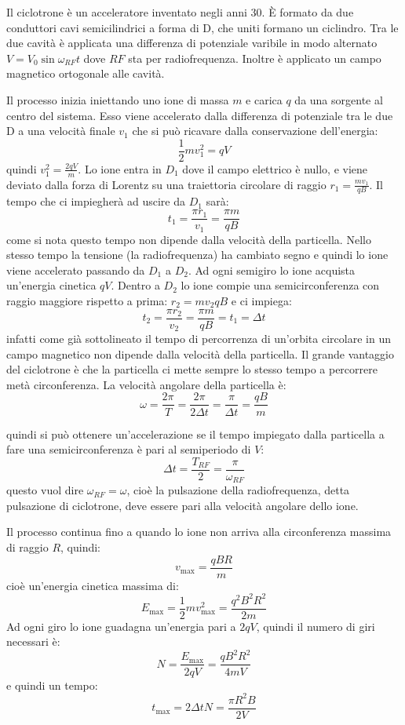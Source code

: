 \begin{Es}[Ciclotrone]
 Il ciclotrone  è un acceleratore inventato negli anni 30. È formato da due conduttori cavi semicilindrici a forma di D, che uniti formano un ciclindro. Tra le due cavità è applicata una differenza di potenziale varibile in modo alternato $V=V_0\sin\omega_{RF}t$ dove $RF$ sta per radiofrequenza. Inoltre è applicato un campo magnetico ortogonale alle cavità.
 
 Il processo inizia iniettando uno ione di massa $m$ e carica $q$ da una sorgente al centro del sistema. Esso viene accelerato dalla differenza di potenziale tra le due D a una velocità finale $v_1$ che si può ricavare dalla conservazione dell'energia:
 \[
  \frac{1}{2}mv_1^2 = qV
 \]
 quindi $v_1^2 = \frac{2qV}{m}$. Lo ione entra in $D_1$ dove il campo elettrico è nullo, e viene deviato dalla forza di Lorentz su una traiettoria circolare di raggio $r_1=\frac{m v_1}{qB}$. Il tempo che ci impiegherà ad uscire da $D_1$ sarà:
 \[
  t_1 = \frac{\pi r_1}{v_1}=\frac{\pi m}{qB}
 \]
 come si nota questo tempo non dipende dalla velocità della particella. Nello stesso tempo la tensione (la radiofrequenza) ha cambiato segno e quindi lo ione viene accelerato passando da $D_1$ a $D_2$. Ad ogni semigiro lo ione acquista un'energia cinetica $qV$. Dentro a $D_2$ lo ione compie una semicirconferenza con raggio maggiore rispetto a prima: $r_2={m v_2}{qB}$ e ci impiega:
 \[
  t_2 = \frac{\pi r_2}{v_2}=\frac{\pi m}{qB} = t_1 = \Delta t
 \]
 infatti come già sottolineato il tempo di percorrenza di un'orbita circolare in un campo magnetico non dipende dalla velocità della particella. Il grande vantaggio del ciclotrone è che la particella ci mette sempre lo stesso tempo a percorrere metà circonferenza. La velocità angolare della particella è:
 \[
  \omega = \frac{2\pi}{T} = \frac{2\pi}{2\Delta t} = \frac{\pi}{\Delta t} = \frac{qB}{m}
 \]

 quindi si può ottenere un'accelerazione se il tempo impiegato dalla particella a fare una semicirconferenza è pari al semiperiodo di $V$:
 \[
  \Delta t = \frac{T_{RF}}{2} = \frac{\pi}{\omega_{RF}}
 \]
 questo vuol dire $\omega_{RF}=\omega$, cioè la pulsazione della radiofrequenza, detta pulsazione di ciclotrone, deve essere pari alla velocità angolare dello ione.
 
 Il processo continua fino a quando lo ione non arriva alla circonferenza massima di raggio $R$, quindi:
 \[
  v_{\max} = \frac{qBR}{m}
 \]
 cioè un'energia cinetica massima di:
 \[
  E_{\max} = \frac{1}{2}mv_{\max}^2 = \frac{q^2 B^2 R^2}{2m}
 \]
 Ad ogni giro lo ione guadagna un'energia pari a $2qV$, quindi il numero di giri necessari è:
 \[
  N = \frac{E_{\max}}{2qV} = \frac{qB^2R^2}{4mV}
 \]
 e quindi un tempo:
 \[
  t_{\max} = 2\Delta tN = \frac{\pi R^2 B}{2V}
 \]
 

\end{Es}
